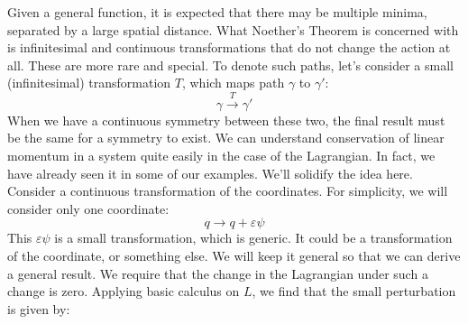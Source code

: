 Given a general function, it is expected that there may be multiple minima, separated by a large spatial distance. What Noether's Theorem is concerned with is infinitesimal and continuous transformations that do not change the action at all. These are more rare and special. To denote such paths, let's consider a small (infinitesimal) transformation $T$, which maps path $\gamma$ to $\gamma'$:
$$\gamma\xrightarrow{T}\gamma'$$
When we have a continuous symmetry between these two, the final result must be the same for a symmetry to exist. We can understand conservation of linear momentum in a system quite easily in the case of the \gls{Lagrangian}. In fact, we have already seen it in some of our examples. We'll solidify the idea here. Consider a continuous transformation of the coordinates. For simplicity, we will consider only one coordinate:
$$q\rightarrow q+\varepsilon\psi$$
This $\varepsilon\psi$ is a small transformation, which is generic. It could be a transformation of the coordinate, or something else. We will keep it general so that we can derive a general result. We require that the change in the \gls{Lagrangian} under such a change is zero. Applying basic calculus on $L$, we find that the small perturbation is given by:

